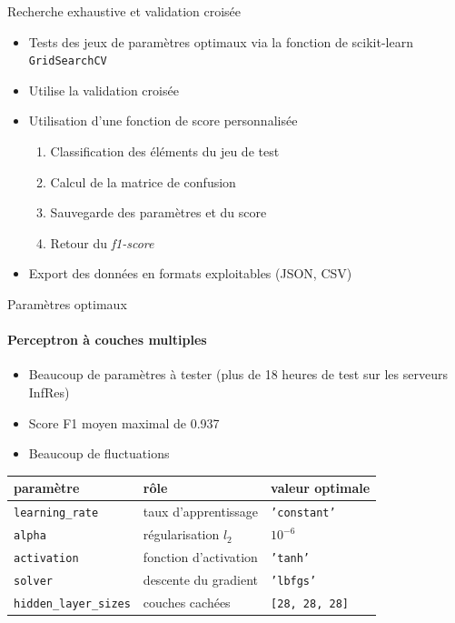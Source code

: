 \documentclass[usenames,dvipsnames]{beamer}
\begin{document}
\begin{frame}{Recherche exhaustive et validation croisée}
\begin{itemize}
\item Tests des jeux de paramètres optimaux via la fonction de scikit-learn \texttt{GridSearchCV}
\item Utilise la validation croisée
\item Utilisation d'une fonction de score personnalisée \begin{enumerate}
\item Classification des éléments du jeu de test
\item Calcul de la matrice de confusion
\item Sauvegarde des paramètres et du score
\item Retour du \emph{f1-score}
\end{enumerate}
\item Export des données en formats exploitables (JSON, CSV)
\end{itemize}
\end{frame}

\begin{frame}{Paramètres optimaux}
\framesubtitle{Perceptron à couches multiples}

\begin{itemize}
\item Beaucoup de paramètres à tester (plus de 18 heures de test sur les serveurs InfRes)
\item Score F1 moyen maximal de 0.937
\item Beaucoup de fluctuations
\end{itemize}

\begin{table}
\centering
\begin{tabular}{l l l}
paramètre & rôle & valeur optimale \\
\hline
\texttt{learning\_rate} & taux d'apprentissage & \texttt{'constant'}\\
\texttt{alpha} & régularisation $l_2$ & $10^{-6}$ \\
\texttt{activation} & fonction d'activation & \texttt{'tanh'}\\
\texttt{solver} & descente du gradient & \texttt{'lbfgs'}\\
\texttt{hidden\_layer\_sizes} & couches cachées & \texttt{[28, 28, 28]}\\
\end{tabular}
\end{table}

\end{frame}
\end{document}
